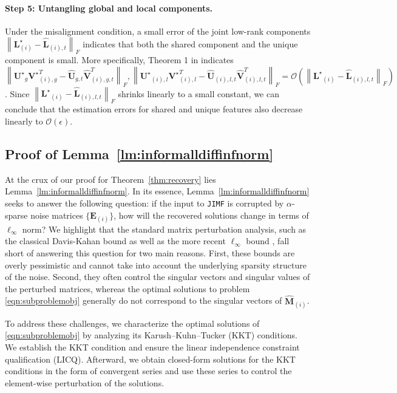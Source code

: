 \documentclass[twoside,11pt]{article}
\def\inneralg{\texttt{JIMF}\xspace}
\newcommand{\norm}[1]{\left\lVert#1\right\rVert}
\newcommand{\matE}{\mathbf{E}}
\newcommand{\matL}{\mathbf{L}}
\newcommand{\matLst}{{\mathbf{L}^\star}}
\newcommand{\matUst}{{\mathbf{U}^\star}}
\newcommand{\matVst}{{\mathbf{V}^\star}}
\newcommand{\hmatL}{\hat{\mathbf{L}}}
\newcommand{\hmatM}{\hat{\mathbf{M}}}
\newcommand{\hmatU}{\hat{\mathbf{U}}}
\newcommand{\hmatV}{\hat{\mathbf{V}}}
\begin{document}
\paragraph{Step 5: Untangling global and local components.} Under the misalignment condition, a small error of the joint low-rank components $\norm{\matL^\star_{(i)}-\hmatL_{(i),t}}_F$ indicates that both the shared component and the unique component is small. More specifically, Theorem 1 in \citet{personalizedpca} indicates $\norm{\matUst_g\matVst_{(i),g}^T-\hmatU_{g,t}\hmatV_{(i),g,t}^T}_F, \norm{\matUst_{(i),l}\matVst_{(i),l}^T-\hmatU_{(i),l,t}\hmatV_{(i),l,t}^T}_F = \mathcal{O}\left(\norm{\matLst_{(i)}-\hmatL_{(i),l,t}}_F\right)$. Since $\norm{\matLst_{(i)}-\hmatL_{(i),l,t}}_F $ shrinks linearly to a small constant, we can conclude that the estimation errors for shared and unique features also decrease linearly to $\mathcal{O}(\epsilon)$. 


\subsection{Proof of Lemma~\ref{lm:informalldiffinfnorm}}
\label{sec:proofsketchofldiffinfnorm}
At the crux of our proof for Theorem~\ref{thm:recovery} lies Lemma~\ref{lm:informalldiffinfnorm}. In its essence, Lemma~\ref{lm:informalldiffinfnorm} seeks to answer the following question: if the input to \inneralg is corrupted by $\alpha$-sparse noise matrices $\{\matE_{(i)}\}$, how will the recovered solutions change in terms of $\ell_{\infty}$ norm? We highlight that the standard matrix perturbation analysis, such as the classical Davis-Kahan bound \citep{matrixanalysis} as well as the more recent $\ell_{\infty}$ bound \citep{linfboundeigenvector}, fall short of answering this question for two main reasons. First, these bounds are overly pessimistic and cannot take into account the underlying sparsity structure of the noise. Second, they often control the singular vectors and singular values of the perturbed matrices, whereas the optimal solutions to problem \eqref{eqn:subproblemobj} generally do not correspond to the singular vectors of $\hmatM_{(i)}$.

To address these challenges, we characterize the optimal solutions of \eqref{eqn:subproblemobj} by analyzing its Karush–Kuhn–Tucker (KKT) conditions. We establish the KKT condition and ensure the linear independence constraint qualification (LICQ). Afterward, we obtain closed-form solutions for the KKT conditions in the form of convergent series and use these series to control the element-wise perturbation of the solutions.
\end{document}
